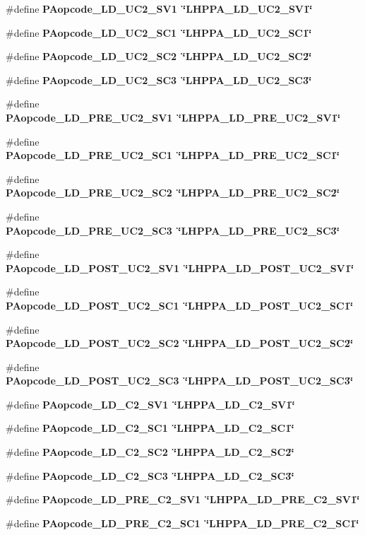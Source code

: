 \begin{CompactItemize}
\item 
\#define \bf{PAopcode\_\-LD\_\-UC2\_\-SV1}~\char`\"{}LHPPA\_\-LD\_\-UC2\_\-SV1\char`\"{}
\item 
\#define \bf{PAopcode\_\-LD\_\-UC2\_\-SC1}~\char`\"{}LHPPA\_\-LD\_\-UC2\_\-SC1\char`\"{}
\item 
\#define \bf{PAopcode\_\-LD\_\-UC2\_\-SC2}~\char`\"{}LHPPA\_\-LD\_\-UC2\_\-SC2\char`\"{}
\item 
\#define \bf{PAopcode\_\-LD\_\-UC2\_\-SC3}~\char`\"{}LHPPA\_\-LD\_\-UC2\_\-SC3\char`\"{}
\item 
\#define \bf{PAopcode\_\-LD\_\-PRE\_\-UC2\_\-SV1}~\char`\"{}LHPPA\_\-LD\_\-PRE\_\-UC2\_\-SV1\char`\"{}
\item 
\#define \bf{PAopcode\_\-LD\_\-PRE\_\-UC2\_\-SC1}~\char`\"{}LHPPA\_\-LD\_\-PRE\_\-UC2\_\-SC1\char`\"{}
\item 
\#define \bf{PAopcode\_\-LD\_\-PRE\_\-UC2\_\-SC2}~\char`\"{}LHPPA\_\-LD\_\-PRE\_\-UC2\_\-SC2\char`\"{}
\item 
\#define \bf{PAopcode\_\-LD\_\-PRE\_\-UC2\_\-SC3}~\char`\"{}LHPPA\_\-LD\_\-PRE\_\-UC2\_\-SC3\char`\"{}
\item 
\#define \bf{PAopcode\_\-LD\_\-POST\_\-UC2\_\-SV1}~\char`\"{}LHPPA\_\-LD\_\-POST\_\-UC2\_\-SV1\char`\"{}
\item 
\#define \bf{PAopcode\_\-LD\_\-POST\_\-UC2\_\-SC1}~\char`\"{}LHPPA\_\-LD\_\-POST\_\-UC2\_\-SC1\char`\"{}
\item 
\#define \bf{PAopcode\_\-LD\_\-POST\_\-UC2\_\-SC2}~\char`\"{}LHPPA\_\-LD\_\-POST\_\-UC2\_\-SC2\char`\"{}
\item 
\#define \bf{PAopcode\_\-LD\_\-POST\_\-UC2\_\-SC3}~\char`\"{}LHPPA\_\-LD\_\-POST\_\-UC2\_\-SC3\char`\"{}
\item 
\#define \bf{PAopcode\_\-LD\_\-C2\_\-SV1}~\char`\"{}LHPPA\_\-LD\_\-C2\_\-SV1\char`\"{}
\item 
\#define \bf{PAopcode\_\-LD\_\-C2\_\-SC1}~\char`\"{}LHPPA\_\-LD\_\-C2\_\-SC1\char`\"{}
\item 
\#define \bf{PAopcode\_\-LD\_\-C2\_\-SC2}~\char`\"{}LHPPA\_\-LD\_\-C2\_\-SC2\char`\"{}
\item 
\#define \bf{PAopcode\_\-LD\_\-C2\_\-SC3}~\char`\"{}LHPPA\_\-LD\_\-C2\_\-SC3\char`\"{}
\item 
\#define \bf{PAopcode\_\-LD\_\-PRE\_\-C2\_\-SV1}~\char`\"{}LHPPA\_\-LD\_\-PRE\_\-C2\_\-SV1\char`\"{}
\item 
\#define \bf{PAopcode\_\-LD\_\-PRE\_\-C2\_\-SC1}~\char`\"{}LHPPA\_\-LD\_\-PRE\_\-C2\_\-SC1\char`\"{}
\item 

\end{CompactItemize}
